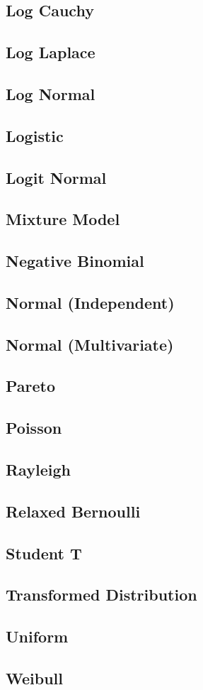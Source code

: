 \subsection{Log Cauchy}
\subsection{Log Laplace}
\subsection{Log Normal}
\subsection{Logistic}
\subsection{Logit Normal}
\subsection{Mixture Model}
\subsection{Negative Binomial}
\subsection{Normal (Independent)}
\subsection{Normal (Multivariate)}
\subsection{Pareto}
\subsection{Poisson}
\subsection{Rayleigh}
\subsection{Relaxed Bernoulli}
\subsection{Student T}
\subsection{Transformed Distribution}
\subsection{Uniform}
\subsection{Weibull}
